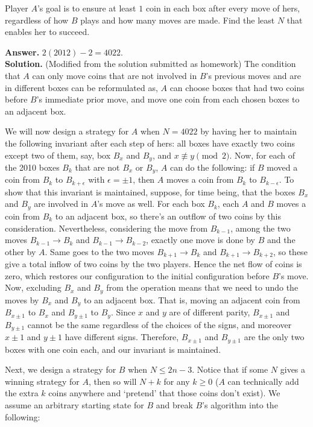 \documentclass[11pt,a4paper]{article}
\begin{document}
\begin{enumerate}
		Player $A$'s goal is to ensure at least $1$ coin in each box after every move of hers, regardless of how $B$ plays and how many moves are made. Find the least $N$ that enables her to succeed.
		
		\textbf{Answer.} $2(2012)-2=4022$. \\
		\textbf{Solution.} (Modified from the solution submitted as homework) The condition that $A$ can only move coins that are not involved in $B$'s previous moves and are in different boxes can be reformulated as, $A$ can choose boxes that had two coins before $B$'s immediate prior move, and move one coin from each chosen boxes to an adjacent box. 
		
		We will now design a strategy for $A$ when $N=4022$ by having her to maintain the following invariant after each step of hers: all boxes have exactly two coins except two of them, say, box $B_x$ and $B_y$, and $x\not\equiv y\pmod{2}$. Now, for each of the 2010 boxes $B_k$ that are not $B_x$ or $B_y$, $A$ can do the following: if $B$ moved a coin from $B_k$ to $B_{k+\epsilon}$ with $\epsilon=\pm 1$, then $A$ moves a coin from $B_k$ to $B_{k-\epsilon}$. 
		To show that this invariant is maintained, suppose, for time being, that the boxes $B_x$ and $B_y$ are involved in $A$'s move as well. For each box $B_k$, each $A$ and $B$ moves a coin from $B_k$ to an adjacent box, so there's an outflow of two coins by this consideration. 
		Nevertheless, considering the move from $B_{k-1}$, among the two moves $B_{k-1}\to B_k$ and $B_{k-1}\to B_{k-2}$, exactly one move is done by $B$ and the other by $A$. Same goes to the two moves $B_{k+1}\to B_k$ and $B_{k+1}\to B_{k+2}$, so these give a total inflow of two coins by the two players. Hence the net flow of coins is zero, which restores our configuration to the initial configuration before $B$'s move. Now, excluding $B_x$ and $B_y$ from the operation means that we need to undo the moves by $B_x$ and $B_y$ to an adjacent box. That is, moving an adjacent coin from $B_{x\pm 1}$ to $B_x$ and $B_{y\pm 1}$ to $B_y$. Since $x$ and $y$ are of different parity, $B_{x\pm 1}$ and $B_{y\pm 1}$ cannot be the same regardless of the choices of the signs, and moreover $x\pm 1$ and $y\pm 1$ have different signs. Therefore, $B_{x\pm 1}$ and $B_{y\pm 1}$ are the only two boxes with one coin each, and our invariant is maintained. 
		
		Next, we design a strategy for $B$ when $N\le 2n-3$. Notice that if some $N$ gives a winning strategy for $A$, then so will $N+k$ for any $k\ge 0$ ($A$ can technically add the extra $k$ coins anywhere and `pretend' that those coins don't exist). We assume an arbitrary starting state for $B$ and break $B$'s algorithm into the following: 
		

\end{enumerate}
\end{document}
